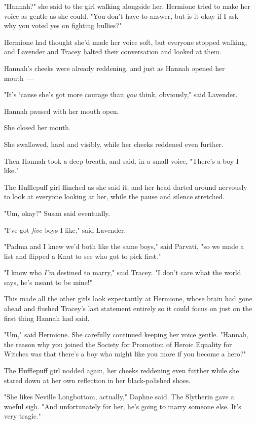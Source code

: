 "Hannah?" she said to the girl walking alongside her. Hermione tried to make
her voice as gentle as she could. "You don't have to answer, but is it okay if
I ask why you voted yes on fighting bullies?"

Hermione had thought she'd made her voice soft, but everyone stopped walking,
and Lavender and Tracey halted their conversation and looked at them.

Hannah's cheeks were already reddening, and just as Hannah opened her mouth~---

"It's `cause she's got more courage than \emph{you} think, obviously," said
Lavender.

Hannah paused with her mouth open.

She closed her mouth.

She swallowed, hard and visibly, while her cheeks reddened even further.

Then Hannah took a deep breath, and said, in a small voice, "There's a boy I
like."

The Hufflepuff girl flinched as she said it, and her head darted around
nervously to look at everyone looking at her, while the pause and silence
stretched.

"Um, okay?" Susan said eventually.

"I've got \emph{five} boys I like," said Lavender.

"Padma and I knew we'd both like the same boys," said Parvati, "so we made a
list and flipped a Knut to see who got to pick first."

"I know who \emph{I'm} destined to marry," said Tracey. "I don't care what the
world says, he's meant to be mine!"

This made all the other girls look expectantly at Hermione, whose brain had
gone ahead and flushed Tracey's last statement entirely so it could focus on
just on the first thing Hannah had said.

"Um," said Hermione. She carefully continued keeping her voice gentle. "Hannah,
the reason why you joined the Society for Promotion of Heroic Equality for
Witches was that there's a boy who might like you more if you become a hero?"

The Hufflepuff girl nodded again, her cheeks reddening even further while she
stared down at her own reflection in her black-polished shoes.

"She likes Neville Longbottom, actually," Daphne said. The Slytherin gave a
woeful sigh. "And unfortunately for her, he's going to marry someone else. It's
very tragic."

